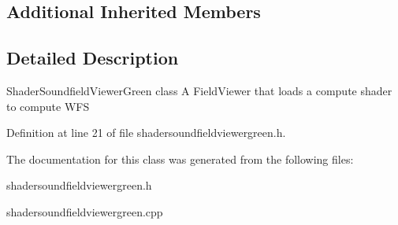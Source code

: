 \subsection*{Additional Inherited Members}


\subsection{Detailed Description}
Shader\-Soundfield\-Viewer\-Green class A Field\-Viewer that loads a compute shader to compute W\-F\-S 

Definition at line 21 of file shadersoundfieldviewergreen.\-h.



The documentation for this class was generated from the following files\-:\begin{DoxyCompactItemize}
\item 
shadersoundfieldviewergreen.\-h\item 
shadersoundfieldviewergreen.\-cpp\end{DoxyCompactItemize}
